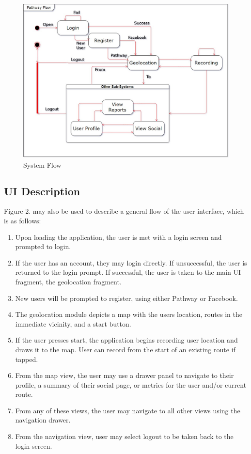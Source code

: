 \documentclass{article}
\begin{document}
\begin{figure}[!htb]
    \centering
    \includegraphics[width=\textwidth]{systemFlow.jpg}
    \caption{System Flow}
    \label{fig:my_label}
\end{figure}

\subsection{UI Description}
Figure 2. may also be used to describe a general flow of the user interface, which is as follows:
\begin{enumerate}
    \item Upon loading the application, the user is met with a login screen and prompted to login.
    \item If the user has an account, they may login directly.
    \subitem If unsuccessful, the user is returned to the login prompt.
    \subitem If successful, the user is taken to the main UI fragment, the geolocation fragment.
    \item New users will be prompted to register, using either Pathway or Facebook.
    \item The geolocation module depicts a map with the users location, routes in the immediate vicinity, and a start button.
    \item If the user presses start, the application begins recording user location and draws it to the map.
    \subitem User can record from the start of an existing route if tapped.
    \item From the map view, the user may use a drawer panel to navigate to their profile, a summary of their social page, or metrics for the user and/or current route.
    \item From any of these views, the user may navigate to all other views using the navigation drawer.
    \item From the navigation view, user may select logout to be taken back to the login screen.
\end{enumerate}
\end{document}

